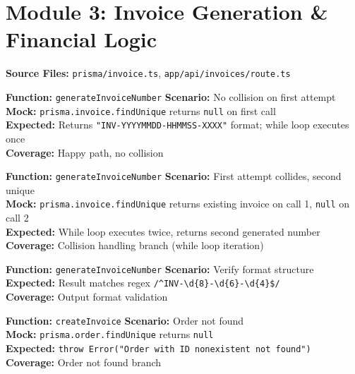 ﻿\documentclass[12pt,a4paper]{report}
\newcommand{\ptwo}{\textbf{\color{p2orange}P2}}
\newcommand{\pthree}{\textbf{\color{p3blue}P3}}
\begin{document}
\section{Module 3: Invoice Generation \& Financial Logic}

\textbf{Source Files:} \texttt{prisma/invoice.ts}, \texttt{app/api/invoices/route.ts}

\begin{tcolorbox}[testbox,title={INV-001 \hfill \ptwo}]
\textbf{Function:} \texttt{generateInvoiceNumber} \quad \textbf{Scenario:} No collision on first attempt \\
\textbf{Mock:} \texttt{prisma.invoice.findUnique} returns \texttt{null} on first call \\
\textbf{Expected:} Returns \texttt{"INV-YYYYMMDD-HHMMSS-XXXX"} format; while loop executes once \\
\textbf{Coverage:} Happy path, no collision
\end{tcolorbox}

\begin{tcolorbox}[testbox,title={INV-002 \hfill \pthree}]
\textbf{Function:} \texttt{generateInvoiceNumber} \quad \textbf{Scenario:} First attempt collides, second unique \\
\textbf{Mock:} \texttt{prisma.invoice.findUnique} returns existing invoice on call 1, \texttt{null} on call 2 \\
\textbf{Expected:} While loop executes twice, returns second generated number \\
\textbf{Coverage:} Collision handling branch (while loop iteration)
\end{tcolorbox}

\begin{tcolorbox}[testbox,title={INV-003 \hfill \pthree}]
\textbf{Function:} \texttt{generateInvoiceNumber} \quad \textbf{Scenario:} Verify format structure \\
\textbf{Expected:} Result matches regex \texttt{/\^{}INV-\textbackslash{}d\{8\}-\textbackslash{}d\{6\}-\textbackslash{}d\{4\}\$/} \\
\textbf{Coverage:} Output format validation
\end{tcolorbox}

\begin{tcolorbox}[testbox,title={INV-004 \hfill \ptwo}]
\textbf{Function:} \texttt{createInvoice} \quad \textbf{Scenario:} Order not found \\
\textbf{Mock:} \texttt{prisma.order.findUnique} returns \texttt{null} \\
\textbf{Expected:} \texttt{throw Error("Order with ID nonexistent not found")} \\
\textbf{Coverage:} Order not found branch
\end{tcolorbox}
\end{document}
